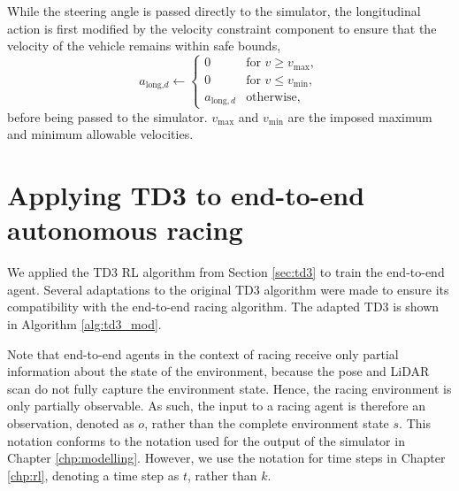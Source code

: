 While the steering angle is passed directly to the simulator, the longitudinal action is first modified by the velocity constraint component to ensure that the velocity of the vehicle remains within safe bounds,
\begin{equation}
    a_{\text{long,}d} \leftarrow 
    \begin{cases}
    0                   &   \text{for } v \geq v_{\text{max}}, \\
    0                   &   \text{for } v \leq v_{\text{min}}, \\
    a_{\text{long},d}   &   \text{otherwise},
    \end{cases}
\label{eq:speed_limit}
\end{equation}
before being passed to the simulator. $v_{\text{max}}$ and $v_{\text{min}}$ are the imposed maximum and minimum allowable velocities.




\section{Applying TD3 to end-to-end autonomous racing}\label{sec:td3_end_to_end}

We applied the TD3 RL algorithm from Section \ref{sec:td3} to train the end-to-end agent.
Several adaptations to the original TD3 algorithm were made to ensure its compatibility with the end-to-end racing algorithm.
The adapted TD3 is shown in Algorithm \ref{alg:td3_mod}.



Note that end-to-end agents in the context of racing receive only partial information about the state of the environment, because the pose and LiDAR scan do not fully capture the environment state.
Hence, the racing environment is only partially observable.
As such, the input to a racing agent is therefore an observation, denoted as $o$, rather than the complete environment state $s$.
This notation conforms to the notation used for the output of the simulator in Chapter \ref{chp:modelling}.
However, we use the notation for time steps in Chapter \ref{chp:rl}, denoting a time step as $t$, rather than $k$.



